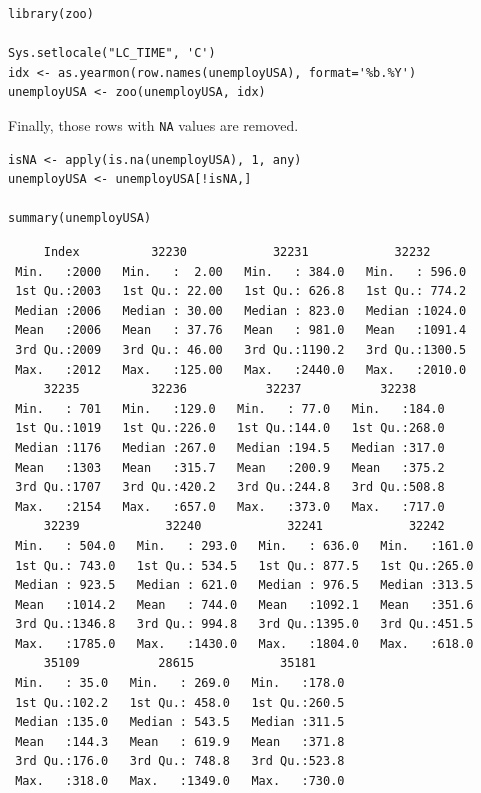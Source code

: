 \documentclass[smallroyalvopaper]{memoir}
\begin{document}
\lstset{language=r,label= ,caption= ,captionpos=b,numbers=none}
\begin{lstlisting}
library(zoo)
  
Sys.setlocale("LC_TIME", 'C')
idx <- as.yearmon(row.names(unemployUSA), format='%b.%Y')
unemployUSA <- zoo(unemployUSA, idx)
\end{lstlisting}


Finally, those rows with \texttt{NA} values are removed.

\lstset{language=r,label= ,caption= ,captionpos=b,numbers=none}
\begin{lstlisting}
isNA <- apply(is.na(unemployUSA), 1, any)
unemployUSA <- unemployUSA[!isNA,]

summary(unemployUSA)
\end{lstlisting}

\begin{verbatim}
     Index          32230            32231            32232       
 Min.   :2000   Min.   :  2.00   Min.   : 384.0   Min.   : 596.0  
 1st Qu.:2003   1st Qu.: 22.00   1st Qu.: 626.8   1st Qu.: 774.2  
 Median :2006   Median : 30.00   Median : 823.0   Median :1024.0  
 Mean   :2006   Mean   : 37.76   Mean   : 981.0   Mean   :1091.4  
 3rd Qu.:2009   3rd Qu.: 46.00   3rd Qu.:1190.2   3rd Qu.:1300.5  
 Max.   :2012   Max.   :125.00   Max.   :2440.0   Max.   :2010.0  
     32235          32236           32237           32238      
 Min.   : 701   Min.   :129.0   Min.   : 77.0   Min.   :184.0  
 1st Qu.:1019   1st Qu.:226.0   1st Qu.:144.0   1st Qu.:268.0  
 Median :1176   Median :267.0   Median :194.5   Median :317.0  
 Mean   :1303   Mean   :315.7   Mean   :200.9   Mean   :375.2  
 3rd Qu.:1707   3rd Qu.:420.2   3rd Qu.:244.8   3rd Qu.:508.8  
 Max.   :2154   Max.   :657.0   Max.   :373.0   Max.   :717.0  
     32239            32240            32241            32242      
 Min.   : 504.0   Min.   : 293.0   Min.   : 636.0   Min.   :161.0  
 1st Qu.: 743.0   1st Qu.: 534.5   1st Qu.: 877.5   1st Qu.:265.0  
 Median : 923.5   Median : 621.0   Median : 976.5   Median :313.5  
 Mean   :1014.2   Mean   : 744.0   Mean   :1092.1   Mean   :351.6  
 3rd Qu.:1346.8   3rd Qu.: 994.8   3rd Qu.:1395.0   3rd Qu.:451.5  
 Max.   :1785.0   Max.   :1430.0   Max.   :1804.0   Max.   :618.0  
     35109           28615            35181      
 Min.   : 35.0   Min.   : 269.0   Min.   :178.0  
 1st Qu.:102.2   1st Qu.: 458.0   1st Qu.:260.5  
 Median :135.0   Median : 543.5   Median :311.5  
 Mean   :144.3   Mean   : 619.9   Mean   :371.8  
 3rd Qu.:176.0   3rd Qu.: 748.8   3rd Qu.:523.8  
 Max.   :318.0   Max.   :1349.0   Max.   :730.0
\end{verbatim}
\end{document}
